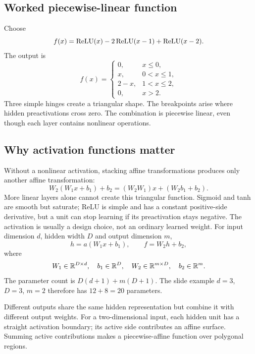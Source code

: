 \documentclass[11pt]{article}
\begin{document}
\subsection{Worked piecewise-linear function}
Choose
\[
f(x)=\operatorname{ReLU}(x)-2\operatorname{ReLU}(x-1)+\operatorname{ReLU}(x-2).
\]
The output is
\[
f(x)=\begin{cases}
0,&x\leq0,\\x,&0<x\leq1,\\2-x,&1<x\leq2,\\0,&x>2.
\end{cases}
\]
Three simple hinges create a triangular shape. The breakpoints arise where hidden preactivations cross zero. The combination is piecewise linear, even though each layer contains nonlinear operations.
\begin{center}
\end{center}
\subsection{Why activation functions matter}
Without a nonlinear activation, stacking affine transformations produces only another affine transformation:
\[
W_2(W_1x+b_1)+b_2=(W_2W_1)x+(W_2b_1+b_2).
\]
More linear layers alone cannot create this triangular function. Sigmoid and tanh are smooth but saturate; ReLU is simple and has a constant positive-side derivative, but a unit can stop learning if its preactivation stays negative. The activation is usually a design choice, not an ordinary learned weight.
For input dimension $d$, hidden width $D$ and output dimension $m$,
\[
h=a(W_1x+b_1),\qquad f=W_2h+b_2,
\]
where
\[
W_1\in\mathbb{R}^{D\times d},\quad b_1\in\mathbb{R}^D,\quad
W_2\in\mathbb{R}^{m\times D},\quad b_2\in\mathbb{R}^m.
\]
The parameter count is $D(d+1)+m(D+1)$. The slide example $d=3$, $D=3$, $m=2$ therefore has $12+8=20$ parameters.

Different outputs share the same hidden representation but combine it with different output weights. For a two-dimensional input, each hidden unit has a straight activation boundary; its active side contributes an affine surface. Summing active contributions makes a piecewise-affine function over polygonal regions.
\end{document}
